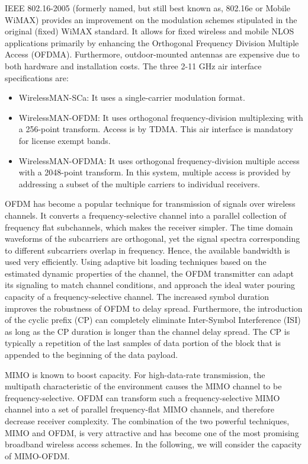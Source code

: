 IEEE 802.16-2005 (formerly named, but still best known as, 802.16e
or Mobile WiMAX) provides an improvement on the modulation schemes
stipulated in the original (fixed) WiMAX standard. It allows for
fixed wireless and mobile NLOS applications primarily by enhancing
the Orthogonal Frequency Division Multiple Access (OFDMA).
Furthermore, outdoor-mounted antennas are expensive due to both
hardware and installation costs. The three 2-11 GHz air interface
specifications \cite{15} are:
\begin{itemize}
\item
WirelessMAN-SCa: It uses a single-carrier modulation format.
\item
WirelessMAN-OFDM: It uses orthogonal frequency-division multiplexing
with a 256-point transform. Access is by TDMA. This air interface is
mandatory for license exempt bands.
\item
WirelessMAN-OFDMA: It uses orthogonal frequency-division multiple
access with a 2048-point transform. In this system, multiple access
is provided by addressing a subset of the multiple carriers to
individual receivers.
\end{itemize}

OFDM has become a popular technique for transmission of signals over
wireless channels. It converts a frequency-selective channel into a
parallel collection of frequency flat subchannels, which makes the
receiver simpler. The time domain waveforms of the subcarriers are
orthogonal, yet the signal spectra corresponding to different
subcarriers overlap in frequency. Hence, the available bandwidth is
used very efficiently. Using adaptive bit loading techniques based
on the estimated dynamic properties of the channel, the OFDM
transmitter can adapt its signaling to match channel conditions, and
approach the ideal water pouring capacity of a frequency-selective
channel. The increased symbol duration improves the robustness of
OFDM to delay spread. Furthermore, the introduction of the cyclic
prefix (CP) can completely eliminate Inter-Symbol Interference (ISI)
as long as the CP duration is longer than the channel delay spread.
The CP is typically a repetition of the last samples of data portion
of the block that is appended to the beginning of the data payload.

MIMO is known to boost capacity. For high-data-rate transmission,
the multipath characteristic of the environment causes the MIMO
channel to be frequency-selective.  OFDM can transform such a
frequency-selective MIMO channel into a set of parallel
frequency-flat MIMO channels, and therefore decrease receiver
complexity. The combination of the two powerful techniques, MIMO and
OFDM, is very attractive and has become one of the most promising
broadband wireless access schemes. In the following, we will
consider the capacity of MIMO-OFDM.

